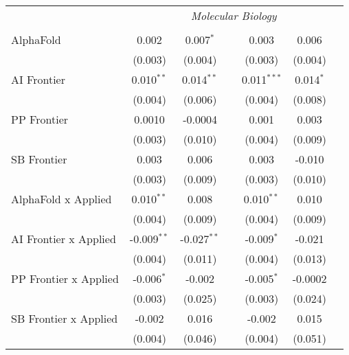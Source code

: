\begin{tabular}{lcccccc}
 & \multicolumn{6}{c}{\textit{Molecular Biology}} \\ \\
   AlphaFold                      & 0.002         & 0.007$^{*}$   &                & 0.003         & 0.006       &   \\   
                                  & (0.003)       & (0.004)       &                & (0.003)       & (0.004)     &   \\   
   AI Frontier                    & 0.010$^{**}$  & 0.014$^{**}$  &                & 0.011$^{***}$ & 0.014$^{*}$ &   \\   
                                  & (0.004)       & (0.006)       &                & (0.004)       & (0.008)     &   \\   
   PP Frontier                    & 0.0010        & -0.0004       &                & 0.001         & 0.003       &   \\   
                                  & (0.003)       & (0.010)       &                & (0.004)       & (0.009)     &   \\   
   SB Frontier                    & 0.003         & 0.006         &                & 0.003         & -0.010      &   \\   
                                  & (0.003)       & (0.009)       &                & (0.003)       & (0.010)     &   \\   
   AlphaFold x Applied            & 0.010$^{**}$  & 0.008         &                & 0.010$^{**}$  & 0.010       &   \\   
                                  & (0.004)       & (0.009)       &                & (0.004)       & (0.009)     &   \\   
   AI Frontier x Applied          & -0.009$^{**}$ & -0.027$^{**}$ &                & -0.009$^{*}$  & -0.021      &   \\   
                                  & (0.004)       & (0.011)       &                & (0.004)       & (0.013)     &   \\   
   PP Frontier x Applied          & -0.006$^{*}$  & -0.002        &                & -0.005$^{*}$  & -0.0002     &   \\   
                                  & (0.003)       & (0.025)       &                & (0.003)       & (0.024)     &   \\   
   SB Frontier x Applied          & -0.002        & 0.016         &                & -0.002        & 0.015       &   \\   
                                  & (0.004)       & (0.046)       &                & (0.004)       & (0.051)     &   \\   

\end{tabular}
